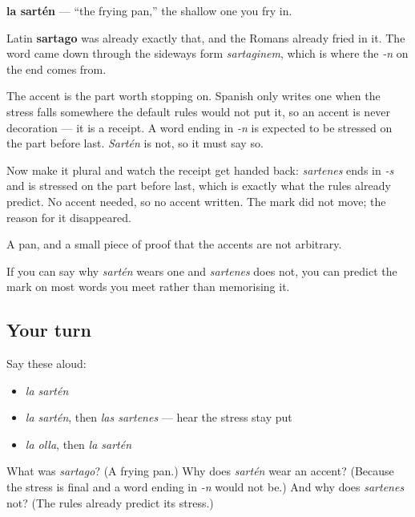 \begin{cousinweb}
\textbf{la sartén} — \textquotedblleft{}the frying pan,\textquotedblright{} the shallow one you fry in.

Latin \textbf{sartago} was already exactly that, and the Romans already fried in it. The word came down through the sideways form \emph{sartaginem}, which is where the \emph{-n} on the end comes from.

The accent is the part worth stopping on. Spanish only writes one when the stress falls somewhere the default rules would not put it, so an accent is never decoration — it is a receipt. A word ending in \emph{-n} is expected to be stressed on the part before last. \emph{Sartén} is not, so it must say so.

Now make it plural and watch the receipt get handed back: \emph{sartenes} ends in \emph{-s} and is stressed on the part before last, which is exactly what the rules already predict. No accent needed, so no accent written. The mark did not move; the reason for it disappeared.
\end{cousinweb}

\begin{grammarlens}[title={What you've built}]
A pan, and a small piece of proof that the accents are not arbitrary.

If you can say why \emph{sartén} wears one and \emph{sartenes} does not, you can predict the mark on most words you meet rather than memorising it.
\end{grammarlens}

\subsection*{Your turn}
Say these aloud:

\begin{itemize}
\raggedright
  \item \emph{la sartén}
  \item \emph{la sartén}, then \emph{las sartenes} — hear the stress stay put
  \item \emph{la olla}, then \emph{la sartén}
\end{itemize}

\begin{tcolorbox}[breakable,colback=teal!4,colframe=teal!35!black,title={Before you move on}]
What was \emph{sartago}? (A frying pan.) Why does \emph{sartén} wear an accent? (Because the stress is final and a word ending in \emph{-n} would not be.) And why does \emph{sartenes} not? (The rules already predict its stress.)
\end{tcolorbox}
